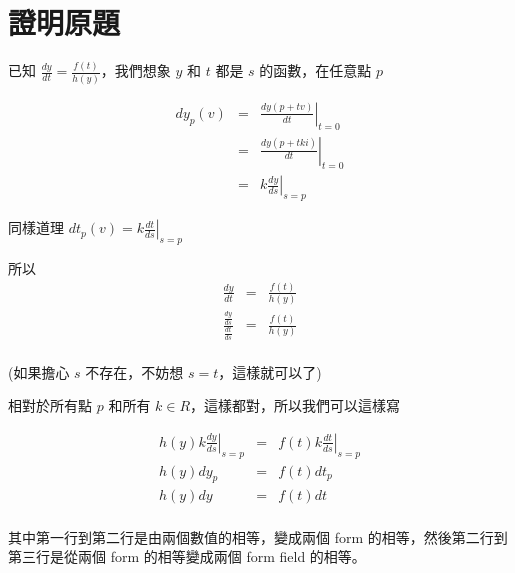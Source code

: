 \documentclass{article}
\begin{document}
\section{證明原題}
已知 $ \frac{dy}{dt} = \frac{f(t)}{h(y)} $，我們想象 $ y $ 和 $ t $ 都是 $ s $ 的函數，在任意點 $ p $

\begin{eqnarray*}
  dy_p(v) &=& \left. \frac{dy(p + tv)}{dt}\right|_{t = 0} \\
          &=& \left. \frac{dy(p + tki)}{dt}\right|_{t = 0} \\
          &=& k \left. \frac{dy}{ds}\right|_{s = p}
\end{eqnarray*}

同樣道理 $ dt_p(v) = k \left. \frac{dt}{ds}\right|_{s = p} $

所以
\begin{eqnarray*}
  \frac{dy}{dt} &=& \frac{f(t)}{h(y)} \\
  \frac{\frac{dy}{ds}}{\frac{dt}{ds}} &=& \frac{f(t)}{h(y)} \\
\end{eqnarray*}

(如果擔心 $ s $ 不存在，不妨想 $ s = t $，這樣就可以了)

相對於所有點 $ p $ 和所有 $ k \in R $，這樣都對，所以我們可以這樣寫

\begin{eqnarray*}
  h(y) k \left. \frac{dy}{ds}\right|_{s = p} &=& f(t) k \left. \frac{dt}{ds}\right|_{s = p} \\
  h(y) dy_p &=& f(t) dt_p \\
  h(y) dy &=& f(t) dt \\
\end{eqnarray*}

其中第一行到第二行是由兩個數值的相等，變成兩個 form 的相等，然後第二行到第三行是從兩個 form 的相等變成兩個 form field 的相等。
\end{document}
